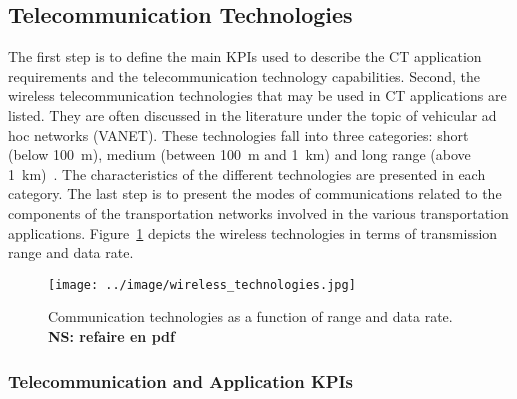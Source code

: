 
\subsection{Telecommunication Technologies}
The first step is to define the main \acrshort{KPI}s used to describe the \acrshort{CT} application requirements and the telecommunication technology capabilities. Second, the wireless telecommunication technologies that may be used in \acrshort{CT} applications are listed. They are often discussed in the literature under the topic of vehicular ad hoc networks (VANET). These technologies fall into three categories: short (below 100~m), medium (between 100~m and 1~km) and long range (above 1~km)~\cite{anwer_survey_2014,shree_novel_2016}. 
The characteristics of the different technologies are presented in each category. 
The last step is to present the modes of communications related to the components of the transportation networks involved in the various transportation applications. 
Figure~\ref{fig:wireless_techs} depicts the wireless technologies in terms of transmission range and data rate.

\begin{figure}[ht!]
  \begin{center}
    \texttt{[image: ../image/wireless\_technologies.jpg]}
    \caption{Communication technologies as a function of range and data rate. {\bf NS: refaire en pdf}}
    \label{fig:wireless_techs}
  \end{center}
\end{figure}

\subsubsection{Telecommunication and Application KPIs}

